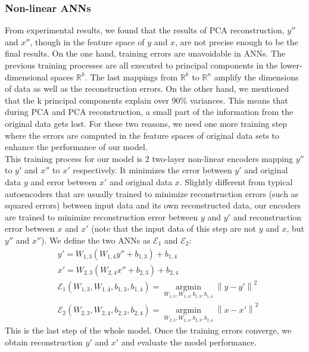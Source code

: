 \documentclass[12pt]{report} %
\newcommand{\norm}[1]{\left\lVert #1 \right\rVert}
\begin{document}
\subsubsection{Non-linear ANNs}
From experimental results, we found that the results of PCA reconstruction, $y''$ and $x''$, though in the feature space of $y$ and $x$, are not precise enough to be the final results. On the one hand, training errors are unavoidable in ANNs. The previous training processes are all executed to principal components in the lower-dimensional spaces $\mathbb{R}^{k}$. The last mappings from $\mathbb{R}^{k}$ to $\mathbb{R}^{n}$ amplify the dimensions of data as well as the reconstruction errors. On the other hand, we mentioned that the k principal components explain over 90\% variances. This means that during PCA and PCA reconstruction, a small part of the information from the original data gets lost. For these two reasons, we need one more training step where the errors are computed in the feature spaces of original data sets to enhance the performance of our model. \\
This training process for our model is 2 two-layer non-linear encoders mapping $y''$ to $y'$ and $x''$ to $x'$ respectively. It minimizes the error between $y'$ and original data $y$ and error between $x'$ and original data $x$. Slightly different from typical autoencoders that are usually trained to minimize reconstruction errors (such as squared errors) between input data and its own reconstructed data, our encoders are trained to minimize reconstruction error between $y$ and $y'$ and reconstruction error between $x$ and $x'$ (note that the input data of this step are not $y$ and $x$, but $y''$ and $x''$). We define the two ANNs as $\mathcal{E}_1$ and $\mathcal{E}_2$:
\begin{equation}
\begin{split}
&y'=W_{1,3}(W_{1,4}y''+b_{1,3})+b_{1,4} \\
&x'=W_{2,3}(W_{2,4}x''+b_{2,3})+b_{2,4} \\
&\mathcal{E}_1(W_{1,3},W_{1,4},b_{1,3},b_{1,4})=\operatorname*{argmin}_{W_{1,3},W_{1,4},b_{1,3},b_{1,4}}\norm{y-y'}^2 \\
&\mathcal{E}_2(W_{2,3},W_{2,4},b_{2,3},b_{2,4})=\operatorname*{argmin}_{W_{2,3},W_{2,4},b_{2,3},b_{2,4}}\norm{x-x'}^2
\end{split}
\end{equation}
This is the last step of the whole model. Once the training errors converge, we obtain reconstruction $y'$ and $x'$ and evaluate the model performance.
\end{document}

